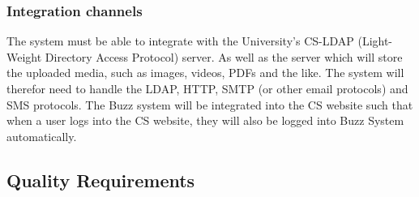 \documentclass[12pt]{article}
\begin{document}
\subsubsection{Integration channels}
The system must be able to integrate with the University's CS-LDAP (Light-Weight Directory Access Protocol) server. As well as the server which will store the uploaded media, such as images, videos, PDFs and the like. The system will therefor need to handle the LDAP, HTTP, SMTP (or other email protocols) and SMS protocols. The Buzz system will be integrated into the CS website such that when a user logs into the CS website, they will also be logged into Buzz System automatically.


\subsection{Quality Requirements}
\end{document}
